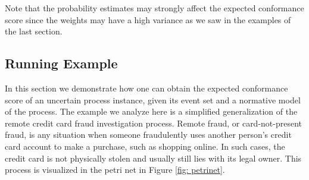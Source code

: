Note that the probability estimates may strongly affect the expected conformance score since the weights may have a high variance as we saw in the examples of the last section.

\subsection{Running Example}
In this section we demonstrate how one can obtain the expected conformance score of an uncertain process instance, given its event set and a normative model of the process.
The example we analyze here is a simplified generalization of the remote credit card fraud investigation process.
Remote fraud, or card-not-present fraud, is any situation when someone fraudulently uses another person's credit card account to make a purchase, such as shopping online.
In such cases, the credit card is not physically stolen and usually still lies with its legal owner.
This process is visualized in the petri net in Figure \ref{fig: petrinet}.

